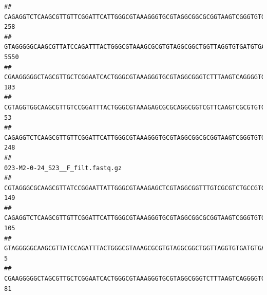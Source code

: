\documentclass[]{article}
\begin{document}
\begin{verbatim}
## CAGAGGTCTCAAGCGTTGTTCGGATTCATTGGGCGTAAAGGGTGCGTAGGCGGCGCGGTAAGTCGGGTGTGAAATCTCGGAGCTTAACTCCGAAACTGCATTCGATACTGCCGTGCTTGAGGACTGGAGAGGAGACTGGAATTTACGGTGTAGCGGTGAAATGCGTAGATATCGTAAGGAAGACCAGTGGCGAAGGCGGGTCTCTGGACAGTTCCTGACGCTGAGGCACGAAGGCCAGGGGAGCAAACG                               258
## GTAGGGGGCAAGCGTTATCCAGATTTACTGGGCGTAAAGCGCGTGTAGGCGGCTGGTTAGGTGTGATGTGAAATCTTCCGGCTCAACCGGAAAACTGCATTGCAAACCGGCCTGGCTAGAGTGCAGGAGAGGGAAGCGGAATTCCAGGTGTAGCGGTGAAATGCGTAGATATCTGGAGGAACACCAGTGGCGAAGGCGGCTTCCTGGCCTGCAACTGACGCTGAGACGCGAAAGCGTGGGGAGCGAAC                               5550
## CGAAGGGGGCTAGCGTTGCTCGGAATCACTGGGCGTAAAGGGTGCGTAGGCGGGTCTTTAAGTCAGGGGTGAAATCCTGGAGCTCAACTCCAGAACTGCCTTTGATACTGAAGATCTTGAGTTCGGGAGAGGTGAGTGGAACTGCGAGTGTAGAGGTGAAATTCGTAGATATTCGCAAGAACACCAGTGGCGAAGGCGGCTCACTGGCCCGATACTGACGCTGAGGCACGAAAGCGTGGGGAGCAAACA                               183
## CGTAGGTGGCAAGCGTTGTCCGGATTTACTGGGCGTAAAGAGCGCGCAGGCGGTCGTTCAAGTCGCGTGTGAAAGCCCCCGGCTCAACTGGGGAGGGTCACGCGATACTGATCGACTCGAAGGCAGGAGAGGGTAGTGGAATTCCCGGTGTAGTGGTGAAATGCGTAGATATCGGGAGGAACACCAGTGGCGAAGGCGACTACCTGGCCTGTTCTTGACGCTGAGGCGCGAAAGCTAGGGGAGCAAACG                                53
## CAGAGGTCTCAAGCGTTGTTCGGATTCATTGGGCGTAAAGGGTGCGTAGGCGGCGCGGTAAGTCGGGTGTGAAATCTCGGGGCTTAACTCCGAAACTGCATTCGATACTGCCGTGCTTGAGGACTGGAGAGGAGACTGGAATTTACGGTGTAGCGGTGAAATGCGTAGATATCGTAAGGAAGACCAGTGGCGAAGGCGGGTCTCTGGACAGTTCCTGACGCTGAGGCACGAAGGCCAGGGGAGCAAACG                               248
##                                                                                                                                                                                                                                                           023-M2-0-24_S23__F_filt.fastq.gz
## CGTAGGGCGCAAGCGTTATCCGGAATTATTGGGCGTAAAGAGCTCGTAGGCGGTTTGTCGCGTCTGCCGTGAAAGTCCGGGGCTCAACTCCGGATCTGCGGTGGGTACGGGCAGACTAGAGTGATGTAGGGGAGACTGGAATTCCTGGTGTAGCGGTGAAATGCGCAGATATCAGGAGGAACACCGATGGCGAAGGCAGGTCTCTGGGCATTAACTGACGCTGAGGAGCGAAAGCATGGGGAGCGAACA                              149
## CAGAGGTCTCAAGCGTTGTTCGGATTCATTGGGCGTAAAGGGTGCGTAGGCGGCGCGGTAAGTCGGGTGTGAAATCTCGGAGCTTAACTCCGAAACTGCATTCGATACTGCCGTGCTTGAGGACTGGAGAGGAGACTGGAATTTACGGTGTAGCGGTGAAATGCGTAGATATCGTAAGGAAGACCAGTGGCGAAGGCGGGTCTCTGGACAGTTCCTGACGCTGAGGCACGAAGGCCAGGGGAGCAAACG                              105
## GTAGGGGGCAAGCGTTATCCAGATTTACTGGGCGTAAAGCGCGTGTAGGCGGCTGGTTAGGTGTGATGTGAAATCTTCCGGCTCAACCGGAAAACTGCATTGCAAACCGGCCTGGCTAGAGTGCAGGAGAGGGAAGCGGAATTCCAGGTGTAGCGGTGAAATGCGTAGATATCTGGAGGAACACCAGTGGCGAAGGCGGCTTCCTGGCCTGCAACTGACGCTGAGACGCGAAAGCGTGGGGAGCGAAC                                 5
## CGAAGGGGGCTAGCGTTGCTCGGAATCACTGGGCGTAAAGGGTGCGTAGGCGGGTCTTTAAGTCAGGGGTGAAATCCTGGAGCTCAACTCCAGAACTGCCTTTGATACTGAAGATCTTGAGTTCGGGAGAGGTGAGTGGAACTGCGAGTGTAGAGGTGAAATTCGTAGATATTCGCAAGAACACCAGTGGCGAAGGCGGCTCACTGGCCCGATACTGACGCTGAGGCACGAAAGCGTGGGGAGCAAACA                               81

\end{verbatim}
\end{document}
